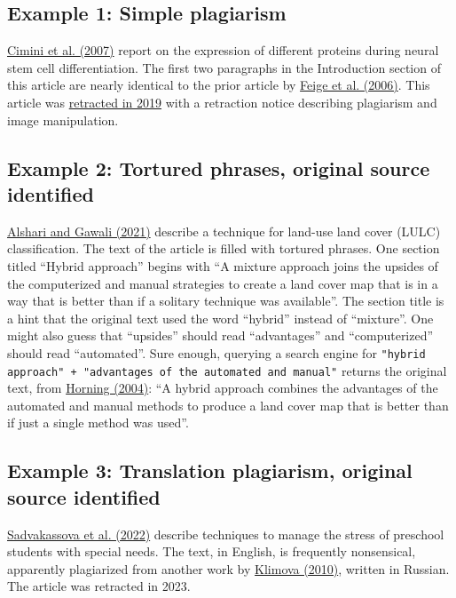 \documentclass[letterpaper, 12pt]{article}
\begin{document}
\subsection*{Example 1: Simple plagiarism}

\href{https://doi.org/10.1155/2007/48242}{Cimini et al. (2007)} report on the expression of different proteins during neural stem cell differentiation. The first two paragraphs in the Introduction section of this article are nearly identical to the prior article by \href{https://doi.org/10.1016/j.plipres.2005.12.002}{Feige et al. (2006)}. This article was \href{https://doi.org/10.1155/2019/5656198}{retracted in 2019} with a retraction notice describing plagiarism and image manipulation. 

\subsection*{Example 2: Tortured phrases, original source identified}

\href{https://doi.org/10.1016/j.gltp.2021.01.002}{Alshari and Gawali (2021)} describe a technique for land-use land cover (LULC) classification. The text of the article is filled with tortured phrases. One section titled ``Hybrid approach'' begins with ``A mixture approach joins the upsides of the computerized and manual strategies to create a land cover map that is in a way that is better than if a solitary technique was available''. The section title is a hint that the original text used the word ``hybrid'' instead of ``mixture''. One might also guess that ``upsides'' should read ``advantages'' and ``computerized'' should read ``automated''. Sure enough, querying a search engine for \verb|"hybrid approach" + "advantages of the automated and manual"| returns the original text, from \href{https://www.amnh.org/content/download/74344/1391366/file/land-cover-classification-methods.pdf}{Horning (2004)}: ``A hybrid approach combines the advantages of the automated and manual methods to
produce a land cover map that is better than if just a single method was used''.

\subsection*{Example 3: Translation plagiarism, original source identified}

\href{https://doi.org/10.1111/mbe.12345}{Sadvakassova et al. (2022)} describe techniques to manage the stress of preschool students with special needs. The text, in English, is frequently nonsensical, apparently plagiarized from another work by \href{https://cyberleninka.ru/article/n/harakteristika-trevozhno-fobicheskogo-sostoyaniya-u-detey-doshkolnogo-vozrasta-s-zaderzhkoy-psihicheskogo-razvitiya-kak}{Klimova (2010)}, written in Russian. The article was retracted in 2023.
\end{document}
